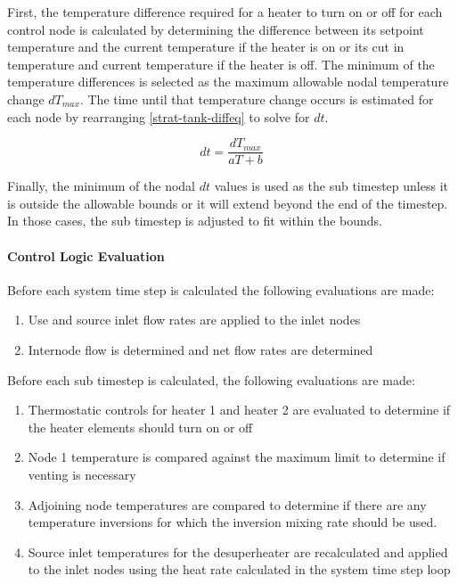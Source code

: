 First, the temperature difference required for a heater to turn on or off for each control node is calculated by determining the difference between its setpoint temperature and the current temperature if the heater is on or its cut in temperature and current temperature if the heater is off. The minimum of the temperature differences is selected as the maximum allowable nodal temperature change $dT_{max}$. The time until that temperature change occurs is estimated for each node by rearranging \ref{strat-tank-diffeq} to solve for $dt$.

\begin{equation}
  dt = \frac{dT_{max}}{aT + b}
\end{equation}

Finally, the minimum of the nodal $dt$ values is used as the sub timestep unless it is outside the allowable bounds or it will extend beyond the end of the timestep. In those cases, the sub timestep is adjusted to fit within the bounds.

\paragraph{Control Logic Evaluation}\label{control-logic-evaluation}

Before each system time step is calculated the following evaluations are made:

\begin{enumerate}
\item Use and source inlet flow rates are applied to the inlet nodes
\item Internode flow is determined and net flow rates are determined
\end{enumerate}

Before each sub timestep is calculated, the following evaluations are made:

\begin{enumerate}
\item Thermostatic controls for heater 1 and heater 2 are evaluated to determine if the heater elements should turn on or off
\item Node 1 temperature is compared against the maximum limit to determine if venting is necessary
\item Adjoining node temperatures are compared to determine if there are any temperature inversions for which the inversion mixing rate should be used.
\item Source inlet temperatures for the desuperheater are recalculated and applied to the inlet nodes using the heat rate calculated in the system time step loop
\end{enumerate}

